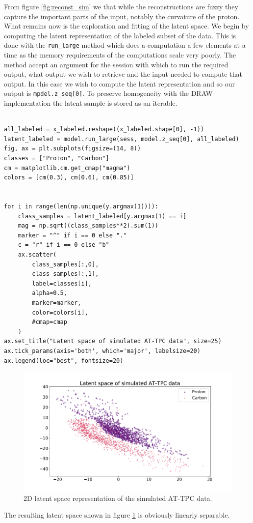 From figure \ref{fig:reconst_sim} we that while the reconstructions are fuzzy they capture the important parts of the input, notably  the curvature of the proton. What remains now is the exploration and fitting of the latent space. We begin by computing the latent representation of the labeled subset of the data. This is done with the \lstinline{run_large} method which does a computation a few elements at a time as the memory requirements of the computations scale very poorly. The method accept an argument for the session with which to run the required output, what output we wish to retrieve and the input needed to compute that output. In this case we wish to compute the latent representation and so our output is \lstinline{mpdel.z_seq[0]}. To preserve homogeneity with the DRAW implementation the latent sample is stored as an iterable. 

\begin{minipage}{\linewidth}
\begin{lstlisting}[language=iPython]

all_labeled = x_labeled.reshape((x_labeled.shape[0], -1))
latent_labeled = model.run_large(sess, model.z_seq[0], all_labeled)
fig, ax = plt.subplots(figsize=(14, 8))
classes = ["Proton", "Carbon"]
cm = matplotlib.cm.get_cmap("magma")
colors = [cm(0.3), cm(0.6), cm(0.85)]


for i in range(len(np.unique(y.argmax(1)))):
    class_samples = latent_labeled[y.argmax(1) == i]
    mag = np.sqrt((class_samples**2).sum(1))
    marker = "^" if i == 0 else "."
    c = "r" if i == 0 else "b"
    ax.scatter(
        class_samples[:,0],
        class_samples[:,1],
        label=classes[i],
        alpha=0.5,
        marker=marker,
        color=colors[i],
        #cmap=cmap
    )
ax.set_title("Latent space of simulated AT-TPC data", size=25)
ax.tick_params(axis='both', which='major', labelsize=20)
ax.legend(loc="best", fontsize=20) 
\end{lstlisting}
\end{minipage}

\begin{figure}[H]
\centering
\includegraphics[width=\textwidth]{latent_sim.pdf}
\caption[2D latent space for simulated data]{2D latent space representation of the simulated AT-TPC data.}\label{fig:latent_sim}
\end{figure}

\noindent The resulting latent space shown in figure \ref{fig:latent_sim} is obviously linearly separable.

